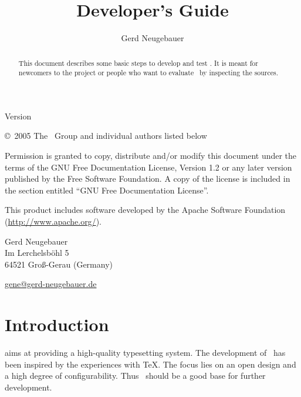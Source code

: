 \documentclass{extex-doc}
\makeatletter
\renewcommand\maketitle{
  \begin{center}
  \parindent=0pt
  \vspace*{1pt}
  \vfill
  \ExTeXbox
  \vfill
  \textsf{\bfseries\Huge \@title}
  \vfill
  \textsf{\Large Version \Version}
  \vfill
  \textsf{\large \@author}
  \vfill
  \vfill
  \end{center}
}
\makeatother
\begin{document}

\begin{titlepage}\parindent=0pt

  \title{Developer's Guide}
  \author{Gerd Neugebauer}
  \maketitle

  \begin{center}
    \begin{abstract}\parindent=0pt
      This document describes some basic steps to develop and test
      \ExTeX.  It is meant for newcomers to the project or people who
      want to evaluate \ExTeX\ by inspecting the sources.
    \end{abstract}
  \end{center}
  \newpage
  \footnotesize
  \copyright\ 2005 The \ExTeX\ Group and individual authors listed below 
  \medskip

Permission is granted to copy, distribute and/or modify this document
under the terms of the GNU Free Documentation License, Version 1.2 or
any later version published by the Free Software Foundation. A copy of
the license is included in the section entitled ``GNU Free
Documentation License''.
\bigskip

This product includes software developed by the Apache Software
Foundation (\url{http://www.apache.org/}).

\vfill

Gerd Neugebauer\\
Im Lerchelsb\"ohl 5\\
64521 Gro\ss-Gerau (Germany)
\smallskip

\href{mailto://gene@gerd-neugebauer.de}{gene@gerd-neugebauer.de}

\end{titlepage}

\tableofcontents
\newpage

\chapter{Introduction}

\ExTeX{} aims at providing a high-quality typesetting system. The
development of \ExTeX\ has been inspired by the experiences with \TeX.
The focus lies on an open design and a high degree of configurability.
Thus \ExTeX\ should be a good base for further development.
\end{document}
